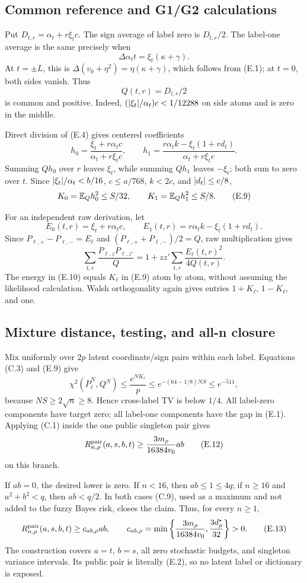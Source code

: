 \subsection{Common reference and G1/G2 calculations}

Put \(D_{t,r}=\alpha_t+r\xi_tc\).  The sign average of label zero is
\(D_{t,r}/2\).  The label-one average is the same precisely when
\[
 \Delta\alpha_tt=\xi_t(\kappa+\gamma).
 \tag{E.6}
\]
At \(t=\pm L\), this is
\(\Delta(v_0+\eta^2)=\eta(\kappa+\gamma)\), which follows from (E.1);
at \(t=0\), both sides vanish.  Thus
\[
 Q(t,r)=D_{t,r}/2
 \tag{E.7}
\]
is common and positive.  Indeed,
\((\lvert \xi_t\rvert/\alpha_t)c<1/12288\) on side atoms and is zero in the
middle.

Direct division of (E.4) gives centered coefficients
\[
 h_0=\frac{\xi_t+r\alpha_tc}{\alpha_t+r\xi_tc},\qquad
 h_1=\frac{r\alpha_tk-\xi_t(1+rd_t)}
 {\alpha_t+r\xi_tc}.
 \tag{E.8}
\]
Summing \(Qh_0\) over \(r\) leaves \(\xi_t\), while summing \(Qh_1\)
leaves \(-\xi_t\); both sum to zero over \(t\).  Since
\(\lvert \xi_t\rvert/\alpha_t<b/16\), \(c\le a/768\),
\(k<2c\), and \(\lvert d_t\rvert\le c/8\),
\[
 K_0=\mathbb E_Qh_0^2\le S/32,\qquad
 K_1=\mathbb E_Qh_1^2\le S/8.
 \tag{E.9}
\]

For an independent raw derivation, let
\[
 E_0(t,r)=\xi_t+r\alpha_tc,\qquad
 E_1(t,r)=r\alpha_tk-\xi_t(1+rd_t).
\]
Since \(P_{\ell,+}-P_{\ell,-}=E_\ell\) and
\((P_{\ell,+}+P_{\ell,-})/2=Q\), raw multiplication gives
\[
 \sum_{t,r}\frac{P_{\ell,z}P_{\ell,z'}}Q
 =1+zz'\sum_{t,r}\frac{E_\ell(t,r)^2}{4Q(t,r)}.
 \tag{E.10}
\]
The energy in (E.10) equals \(K_\ell\) in (E.9) atom by atom, without
assuming the likelihood calculation.  Walsh orthogonality again gives
entries \(1+K_\ell\), \(1-K_\ell\), and one.

\subsection{Mixture distance, testing, and all-n closure}

Mix uniformly over \(2p\) latent coordinate/sign pairs within each label.
Equations (C.3) and (E.9) give
\[
 \chi^2(\overline P_\ell^N,Q^N)
 \le \frac{e^{NK_\ell}}p
 \le e^{-(64-1/8)NS}\le e^{-511},
 \tag{E.11}
\]
because \(NS\ge2\sqrt n\ge8\).  Hence cross-label TV is below \(1/4\).
All label-zero components have target zero; all label-one components have
the gap in (E.1).  Applying (C.1) inside the one public singleton pair gives
\[
 R^{\mathrm{pair}}_{n,\rho}(a,s,b,t)\ge\frac{3m_\rho}{16384v_0}ab
 \tag{E.12}
\]
on this branch.

If \(ab=0\), the desired lower is zero.  If \(n<16\), then
\(ab\le1\le4q\); if \(n\ge16\) and \(a^2+b^2<q\), then
\(ab<q/2\).  In both cases (C.9), used as a maximum and not added to the
fuzzy Bayes risk, closes the claim.  Thus, for every \(n\ge1\),
\[
 R^{\mathrm{pair}}_{n,\rho}(a,s,b,t)\ge c_{ab,\rho}ab,\qquad
 c_{ab,\rho}=
 \min\left\{\frac{3m_\rho}{16384v_0},
             \frac{3d_\rho^\star}{32}\right\}>0.
 \tag{E.13}
\]
The construction covers \(a=t\), \(b=s\), all zero stochastic budgets,
and singleton variance intervals.  Its public pair is literally (E.2), so
no latent label or dictionary is exposed.
